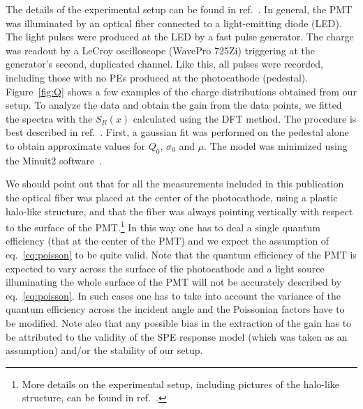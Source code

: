 \documentclass[a4paper,11pt]{article}
\begin{document}
The details of the experimental setup can be found in ref.~\cite{me}.
In general, the PMT was illuminated by an optical fiber connected to a light-emitting diode (LED).
The light pulses were produced at the LED by a fast pulse generator. 
The charge was readout by a LeCroy oscilloscope (WavePro 725Zi) triggering at the generator's second, duplicated channel. 
Like this, all pulses were recorded, including those with no PEs produced at the photocathode (pedestal). 
Figure~\ref{fig:Q} shows a few examples of the charge distributions obtained from our setup.  
To analyze the data and obtain the gain from the data points, we fitted the spectra with the $S_R(x)$ calculated using the DFT method.  
The procedure is best described in ref.~\cite{me}. 
First, a gaussian fit was performed on the pedestal alone to obtain approximate values for $Q_0$, $\sigma_0$ and $\mu$. 
The model was minimized using the Minuit2 software~\cite{Minuit2}. 




We should point out that for all the measurements included in this publication the optical fiber was placed at the center of the photocathode,
using a plastic halo-like structure, and that the fiber was always pointing vertically with respect to the surface of the PMT.\footnote{%
More details on the experimental setup, including pictures of the halo-like structure, can be found in ref.~\cite{thesis}.}
In this way one has to deal a single quantum efficiency (that at the center of the PMT) and we expect the assumption of eq.~\eqref{eq:poisson} to be quite valid. 
Note that the quantum efficiency of the PMT is expected to vary across the surface of the photocathode and a light source illuminating the whole surface of the PMT will not be 
accurately described by eq.~\eqref{eq:poisson}. In such cases one has to take into account the variance of the quantum efficiency across the incident angle and the Poissonian factors have to be modified. 
Note also that any possible bias in the extraction of the gain has to be attributed to the validity of the SPE response model (which was taken as an assumption)
and/or the stability of our setup. 
\end{document}
